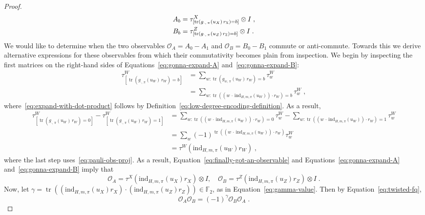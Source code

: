 \documentclass[11pt]{article}
\theoremstyle{definition}
\newcommand{\F}{\ensuremath{\mathbb{F}}}
\newcommand{\ind}{\ensuremath{\textrm{ind}}}
\DeclareMathOperator{\tr}{tr}
\newcommand{\labelstyle}[1]{\ensuremath{\textsc{#1}}\xspace}
\newcommand{\xpt}{\labelstyle{X}}
\newcommand{\zpt}{\labelstyle{Z}}
\begin{document}
\begin{proof}
\begin{align}
    A_b & = \tau^X_{[\tr(g_{\cdot,\, \pi}(u_X)\, r_\xpt) = b]} \otimes I\;,\label{eq:gonna-expand-A}\\
    B_b & = \tau^Z_{[\tr(g_{\cdot,\, \pi}(u_Z)\, r_\zpt) = b]} \otimes I\;.\label{eq:gonna-expand-B}
  \end{align}
We would like to determine when 
  the two observables $\mathcal{O}_A = A_0 -
    A_1$ and $\mathcal{O}_B = B_0 - B_1$ commute or anti-commute.
  Towards this we derive alternative expressions for these observables from which their commutativity becomes plain from inspection.
  We begin by inspecting the first matrices on the right-hand sides of Equations~\eqref{eq:gonna-expand-A}
  and~\eqref{eq:gonna-expand-B}:
  \begin{align}
  \tau^W_{[\tr(g_{\cdot,\, \pi}(u_W)\, r_W) = b]}
  &= \sum_{w : \tr(g_{w,\, \pi}(u_W)\, r_W) = b} \tau^W_w\nonumber\\
  &= \sum_{w : \tr((w\, \cdot\, \ind_{H, m, \pi}(u_W)) \cdot r_W ) = b} \tau^W_w\;,\label{eq:expand-with-dot-product}
  \end{align}
  where~\eqref{eq:expand-with-dot-product}
  follows by  Definition~\ref{eq:low-degree-encoding-definition}.
  As a result,
  \begin{align}
  \tau^W_{[\tr(g_{\cdot,\, \pi}(u_W)\, r_W) = 0]}
  -   \tau^W_{[\tr(g_{\cdot,\, \pi}(u_W)\, r_W) = 1]}
  & = \sum_{w : \tr((w\, \cdot\, \ind_{H, m, \pi}(u_W)) \cdot r_W ) = 0} \tau^W_w
  	- \sum_{w : \tr((w\, \cdot\, \ind_{H, m, \pi}(u_W)) \cdot r_W ) = 1} \tau^W_w\nonumber\\
  & = \sum_{w} (-1)^{\tr((w\, \cdot\, \ind_{H, m, \pi}(u_W)) \cdot r_W )} \tau^W_w\nonumber\\
  & = \tau^W(\ind_{H, m, \pi}(u_W)r_W)\;,\label{eq:finally-got-an-observable}
  \end{align}
  where the last step uses~\eqref{eq:pauli-obs-proj}.
  As a result, Equation~\eqref{eq:finally-got-an-observable}
  and Equations~\eqref{eq:gonna-expand-A} and~\eqref{eq:gonna-expand-B} imply that
  \begin{equation*}
  \mathcal{O}_A = \tau^X(\ind_{H, m, \pi}(u_X)r_X) \otimes I,\quad
  \mathcal{O}_B = \tau^Z(\ind_{H, m, \pi}(u_Z)r_Z) \otimes I\;.
  \end{equation*}
  Now, let $\gamma = \tr((\ind_{H, m, \pi}(u_X)r_X) \cdot (\ind_{H, m, \pi}(u_Z)r_Z)) \in \F_2$,
  as in Equation~\eqref{eq:gamma-value}.
  Then by Equation~\eqref{eq:twisted-fq},
  \begin{equation*}
  \mathcal{O}_A \mathcal{O}_B = (-1)^{\gamma} \mathcal{O}_B \mathcal{O}_A\;.

\end{equation*}
\end{proof}
\end{document}
